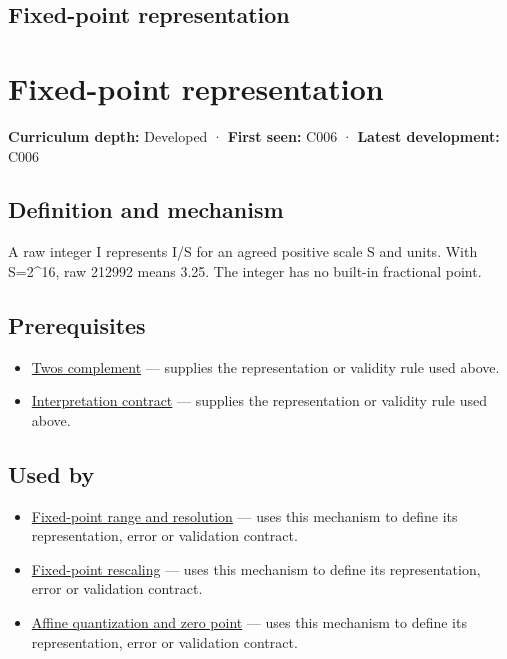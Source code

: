 \hypertarget{appendix-1d0dbe8924cc}{}
\section*{Fixed-point representation}
\chapter{Fixed-point representation}\label{appendix-1d0dbe8924cc-fixed-point-representation}

\textbf{Curriculum depth:} Developed · \textbf{First seen:} C006 · \textbf{Latest development:} C006

\section{Definition and mechanism}\label{appendix-1d0dbe8924cc-definition-and-mechanism}

A raw integer I represents I/S for an agreed positive scale S and units. With S=2\^{}16, raw 212992 means 3.25. The integer has no built-in fractional point.

\section{Prerequisites}\label{appendix-1d0dbe8924cc-prerequisites}

\begin{itemize}
\tightlist
\item
  \hyperref[appendix-4fbc03d20829]{Two\textquotesingle s complement} --- supplies the representation or validity rule used above.
\item
  \hyperref[appendix-f414bd4ed05c]{Interpretation contract} --- supplies the representation or validity rule used above.
\end{itemize}

\section{Used by}\label{appendix-1d0dbe8924cc-used-by}

\begin{itemize}
\tightlist
\item
  \hyperref[appendix-ceb4c4a9b5a1]{Fixed-point range and resolution} --- uses this mechanism to define its representation, error or validation contract.
\item
  \hyperref[appendix-3333db47830f]{Fixed-point rescaling} --- uses this mechanism to define its representation, error or validation contract.
\item
  \hyperref[appendix-d5da3eaabaef]{Affine quantization and zero point} --- uses this mechanism to define its representation, error or validation contract.
\end{itemize}

